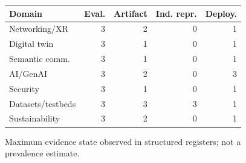 \begin{figure}[H]\centering\scriptsize\begin{tabular}{lrrrr}\toprule Domain&Eval.&Artifact&Ind. repr.&Deploy.\\\midrule Networking/XR&3&2&0&1\\ Digital twin&3&1&0&1\\ Semantic comm.&3&1&0&1\\ AI/GenAI&3&2&0&3\\ Security&3&1&0&1\\ Datasets/testbeds&3&3&3&1\\ Sustainability&3&2&0&1\\\bottomrule\end{tabular}\caption{Maximum evidence state observed in structured registers; not a prevalence estimate.}\label{fig:evidenceheatmap_source}\end{figure}